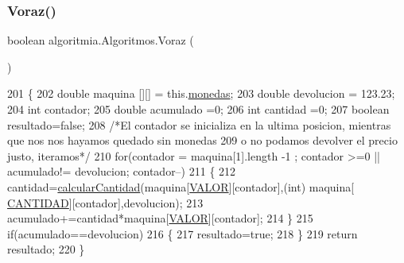 \mbox{\label{classalgoritmia_1_1_algoritmos_a2c160a1d7cd8443433d2b8fc72148304}} 
\subsubsection{\texorpdfstring{Voraz()}{Voraz()}}
{\footnotesize\ttfamily boolean algoritmia.\+Algoritmos.\+Voraz (\begin{DoxyParamCaption}{ }\end{DoxyParamCaption})\hspace{0.3cm}{\ttfamily [inline]}}


\begin{DoxyCode}
201                            \{
202         \textcolor{keywordtype}{double} maquina [][] = this.\mbox{\hyperlink{classalgoritmia_1_1_algoritmos_a3f6bbaa8358a204e6dc486d7e818146f}{monedas}};
203         \textcolor{keywordtype}{double} devolucion = 123.23;
204         \textcolor{keywordtype}{int} contador;
205         \textcolor{keywordtype}{double} acumulado =0;
206         \textcolor{keywordtype}{int} cantidad =0;
207         \textcolor{keywordtype}{boolean} resultado=\textcolor{keyword}{false};
208         \textcolor{comment}{/*El contador se inicializa en la ultima posicion, mientras que nos nos hayamos quedado sin monedas
       }
209 \textcolor{comment}{         o no podamos devolver el precio justo, iteramos*/}
210         \textcolor{keywordflow}{for}(contador = maquina[1].length -1 ; contador >=0 || acumulado!= devolucion; contador--)
211             \{
212                 cantidad=\mbox{\hyperlink{classalgoritmia_1_1_algoritmos_a7c37ed16dedcd133fa5a9a7dec5a734a}{calcularCantidad}}(maquina[\mbox{\hyperlink{classalgoritmia_1_1_algoritmos_ad95879cb27d38d149e733992fb487933}{VALOR}}][contador],(\textcolor{keywordtype}{int}) maquina[
      \mbox{\hyperlink{classalgoritmia_1_1_algoritmos_a42fcc64ce734e24638709e966f66e63b}{CANTIDAD}}][contador],devolucion);
213                 acumulado+=cantidad*maquina[\mbox{\hyperlink{classalgoritmia_1_1_algoritmos_ad95879cb27d38d149e733992fb487933}{VALOR}}][contador];
214             \}
215         \textcolor{keywordflow}{if}(acumulado==devolucion)
216         \{
217             resultado=\textcolor{keyword}{true};
218         \}
219         \textcolor{keywordflow}{return} resultado;
220     \}
\end{DoxyCode}


